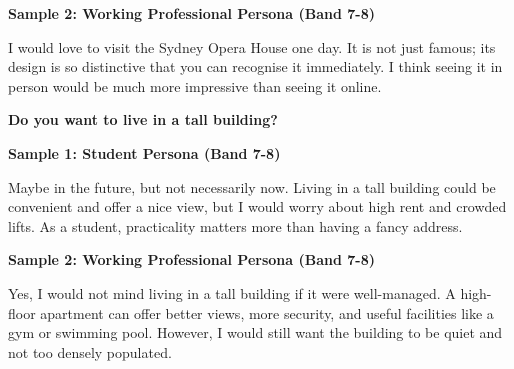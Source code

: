 \textbf{Sample 2: Working Professional Persona (Band 7-8)}

I would love to visit the Sydney Opera House one day. It is not just famous; its design is so distinctive that you can recognise it immediately. I think seeing it in person would be much more impressive than seeing it online.

\separator

\begin{ieltsquestion}
\textbf{Do you want to live in a tall building?}
\end{ieltsquestion}
\textbf{Sample 1: Student Persona (Band 7-8)}

Maybe in the future, but not necessarily now. Living in a tall building could be convenient and offer a nice view, but I would worry about high rent and crowded lifts. As a student, practicality matters more than having a fancy address.

\textbf{Sample 2: Working Professional Persona (Band 7-8)}

Yes, I would not mind living in a tall building if it were well-managed. A high-floor apartment can offer better views, more security, and useful facilities like a gym or swimming pool. However, I would still want the building to be quiet and not too densely populated.

\separator


